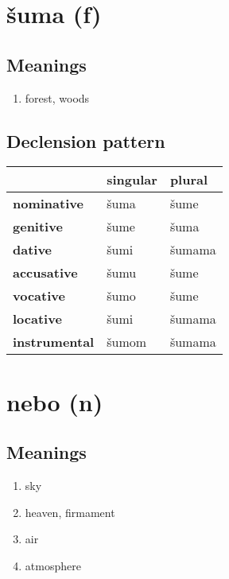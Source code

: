 \filbreak
\section{šuma (f)}
\subsection*{Meanings}
\begin{enumerate}
\item forest, woods
\end{enumerate}
\subsection*{Declension pattern}
\begin{tabularx}{\linewidth}{Xll}
\toprule
{} & singular &  plural \\
\midrule
\textbf{nominative  } &     šuma &    šume \\
\textbf{genitive    } &     šume &    šuma \\
\textbf{dative      } &     šumi &  šumama \\
\textbf{accusative  } &     šumu &    šume \\
\textbf{vocative    } &     šumo &    šume \\
\textbf{locative    } &     šumi &  šumama \\
\textbf{instrumental} &    šumom &  šumama \\
\bottomrule
\end{tabularx}

\filbreak
\section{nebo (n)}
\subsection*{Meanings}
\begin{enumerate}
\item sky
\item heaven, firmament
\item air
\item atmosphere
\end{enumerate}
